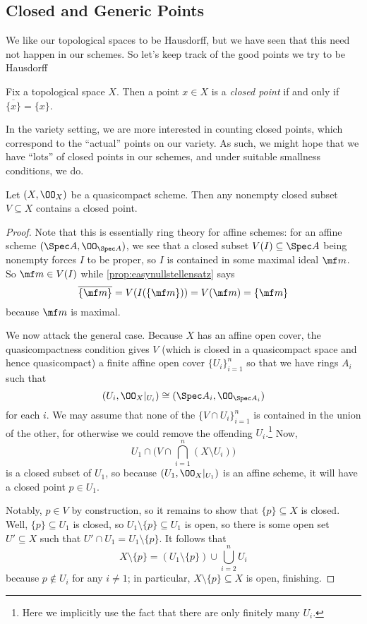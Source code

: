 \documentclass[../notes.tex]{subfiles}
\begin{document}
\subsection{Closed and Generic Points}
We like our topological spaces to be Hausdorff, but we have seen that this need not happen in our schemes. So let's keep track of the good points we try to be Hausdorff
\begin{definition}
	Fix a topological space $X$. Then a point $x\in X$ is a \textit{closed point} if and only if $\overline{\{x\}}=\{x\}$.
\end{definition}
In the variety setting, we are more interested in counting closed points, which correspond to the ``actual'' points on our variety. As such, we might hope that we have ``lots'' of closed points in our schemes, and under suitable smallness conditions, we do.
\begin{lemma} \label{lem:enoughclosedpoints}
	Let $(X,\OO_X)$ be a quasicompact scheme. Then any nonempty closed subset $V\subseteq X$ contains a closed point.
\end{lemma}
\begin{proof}
	Note that this is essentially ring theory for affine schemes: for an affine scheme $(\Spec A,\OO_{\Spec A})$, we see that a closed subset $V(I)\subseteq\Spec A$ being nonempty forces $I$ to be proper, so $I$ is contained in some maximal ideal $\mf m$. So $\mf m\in V(I)$ while \autoref{prop:easynullstellensatz} says
	\[\overline{\{\mf m\}}=V(I(\{\mf m\}))=V(\mf m)=\{\mf m\}\]
	because $\mf m$ is maximal.

	We now attack the general case. Because $X$ has an affine open cover, the quasicompactness condition gives $V$ (which is closed in a quasicompact space and hence quasicompact) a finite affine open cover $\{U_i\}_{i=1}^n$ so that we have rings $A_i$ such that
	\[(U_i,\OO_X|_{U_i})\cong(\Spec A_i,\OO_{\Spec A_i})\]
	for each $i$. We may assume that none of the $\{V\cap U_i\}_{i=1}^n$ is contained in the union of the other, for otherwise we could remove the offending $U_i$.\footnote{Here we implicitly use the fact that there are only finitely many $U_i$.} Now,
	\[U_1\cap\Bigg(V\cap\bigcap_{i=1}^n(X\setminus U_i)\Bigg)\]
	is a closed subset of $U_1$, so because $(U_1,\OO_X|_{U_1})$ is an affine scheme, it will have a closed point $p\in U_1$.

	Notably, $p\in V$ by construction, so it remains to show that $\{p\}\subseteq X$ is closed. Well, $\{p\}\subseteq U_1$ is closed, so $U_1\setminus\{p\}\subseteq U_1$ is open, so there is some open set $U'\subseteq X$ such that $U'\cap U_1=U_1\setminus\{p\}$. It follows that
	\[X\setminus\{p\}=(U_1\setminus\{p\})\cup\bigcup_{i=2}^nU_i\]
	because $p\notin U_i$ for any $i\ne1$; in particular, $X\setminus\{p\}\subseteq X$ is open, finishing.
\end{proof}
\end{document}
